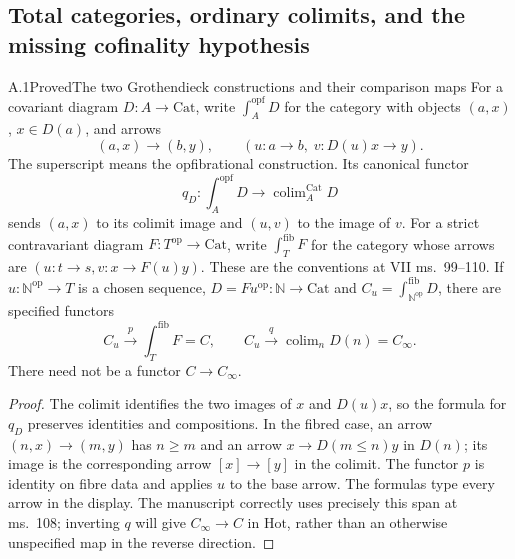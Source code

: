 \subsection{Total categories, ordinary colimits, and the missing cofinality hypothesis}

\begin{result}{A.1}{Proved}{The two Grothendieck constructions and their comparison maps}
For a covariant diagram $D:A\to\mathrm{Cat}$, write
$\int_A^{\mathrm{opf}}D$ for the category with objects $(a,x)$,
$x\in D(a)$, and arrows
\[
 (a,x)\longrightarrow(b,y),\qquad
 (u:a\to b,\;v:D(u)x\to y).
\]
The superscript means the opfibrational construction. Its canonical functor
\[
 q_D:\int_A^{\mathrm{opf}}D\longrightarrow
                  \operatorname{colim}_{A}^{\mathrm{Cat}}D
\]
sends $(a,x)$ to its colimit image and $(u,v)$ to the image of $v$.
For a strict contravariant diagram $F:T^{\mathrm{op}}\to\mathrm{Cat}$,
write $\int_T^{\mathrm{fib}}F$ for the category whose arrows are
$(u:t\to s,v:x\to F(u)y)$. These are the conventions at VII ms.~99--110.
If $u:\mathbb N^{\mathrm{op}}\to T$ is a chosen sequence,
$D=F u^{\mathrm{op}}:\mathbb N\to\mathrm{Cat}$ and
$C_u=\int_{\mathbb N^{\mathrm{op}}}^{\mathrm{fib}}D$, there are specified
functors
\[
 C_u\xrightarrow{p}\int_T^{\mathrm{fib}}F=C,
 \qquad C_u\xrightarrow{q}\operatorname{colim}_{n}D(n)=C_\infty.
\]
There need not be a functor $C\to C_\infty$.
\end{result}
\begin{proof}
The colimit identifies the two images of $x$ and $D(u)x$, so the formula
for $q_D$ preserves identities and compositions. In the fibred case,
an arrow $(n,x)\to(m,y)$ has $n\geq m$ and an arrow
$x\to D(m\leq n)y$ in $D(n)$; its image is the corresponding arrow
$[x]\to[y]$ in the colimit. The functor $p$ is identity on fibre data
and applies $u$ to the base arrow. The formulas type every arrow in the
display. The manuscript correctly uses precisely this span at ms.~108;
inverting $q$ will give $C_\infty\to C$ in $\mathrm{Hot}$, rather than
an otherwise unspecified map in the reverse direction.
\end{proof}

